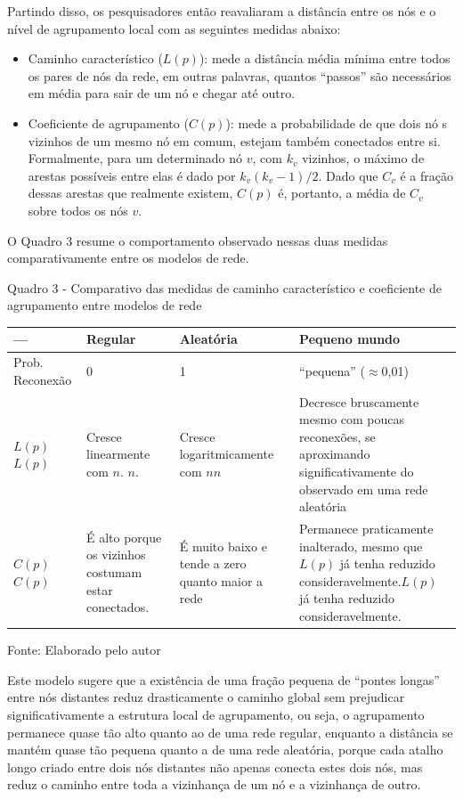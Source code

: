 \documentclass[12pt,oneside,a4paper,brazil,sumario=tradicional]{abntex2}
\begin{document}
Partindo disso, os pesquisadores então reavaliaram a distância entre os nós e o nível de agrupamento local com as seguintes medidas abaixo:

\begin{itemize}
  \item Caminho característico ($L(p)$): mede a distância média mínima entre todos os pares de nós da rede, em outras palavras, quantos “passos” são necessários em média para sair de um nó e chegar até outro.
  \item Coeficiente de agrupamento ($C(p)$): mede a probabilidade de que dois nó s vizinhos de um mesmo nó  em comum, estejam também conectados entre si. Formalmente, para um determinado nó  $v$, com $k_{v}$ vizinhos, o máximo de arestas possíveis entre elas é dado por $k_{v}(k_{v}-1)/2$. Dado que $C_{v}$ é a fração dessas arestas que realmente existem, $C(p)$ é, portanto, a média de $C_{v}$ sobre todos os nós $v$.
\end{itemize}

O Quadro 3 resume o comportamento observado nessas duas medidas comparativamente entre os modelos de rede.

Quadro 3 - Comparativo das medidas de caminho característico e coeficiente de agrupamento entre modelos de rede

\begin{center}
\begin{tabular}{p{4cm}|p{4cm}|p{4cm}|p{4cm}}
\toprule
--- & Regular & Aleatória & Pequeno mundo \\
\midrule
Prob. Reconexão & 0 & 1 & “pequena” ($\approx$0,01) \\
$L(p)$$L(p)$ & Cresce linearmente com $n$. $n$. & Cresce logaritmicamente com $n$$n$ & Decresce bruscamente mesmo com poucas reconexões, se aproximando significativamente do observado em uma rede aleatória \\
$C(p)$$C(p)$ & É alto porque os vizinhos costumam estar conectados. & É muito baixo e tende a zero quanto maior a rede & Permanece praticamente inalterado, mesmo que $L(p)$ já tenha reduzido consideravelmente.$L(p)$ já tenha reduzido consideravelmente. \\
\bottomrule
\end{tabular}
\end{center}
Fonte: Elaborado pelo autor

Este modelo sugere que a existência de uma fração pequena de “pontes longas” entre nós distantes reduz drasticamente o caminho global sem prejudicar significativamente a estrutura local de agrupamento, ou seja, o agrupamento permanece quase tão alto quanto ao de uma rede regular, enquanto a distância se mantém quase tão pequena quanto a de uma rede aleatória, porque cada atalho longo criado entre dois nós distantes não apenas conecta estes dois nós, mas reduz o caminho entre toda a vizinhança de um nó e a vizinhança de outro.
\end{document}

